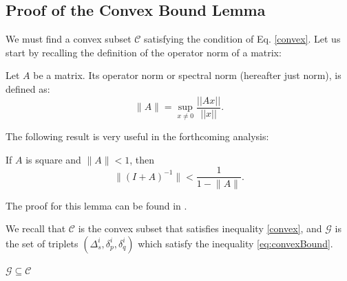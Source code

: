 \subsection{Proof of the Convex Bound Lemma}
\label{sec:appendix1}
We must find a convex subset $\mathcal{C}$ satisfying the condition of Eq. \ref{convex}. Let
us start by recalling the definition of the operator norm of a matrix:
\begin{definition}
Let $A$ be a matrix. Its operator norm or
spectral norm (hereafter just norm), is defined as:
\begin{equation}
\Big \| A \Big \| = \sup_{x \neq 0}\frac{||Ax||}{||x||}.
\end{equation}
\end{definition}
The following result is very useful in the forthcoming analysis:
\begin{lemma} \label{lemma:newman}
If $A$ is square and $\Big \| A \Big \| < 1$, then
\begin{equation*}
\Big \| (I+A)^{-1} \Big \| < \frac{1}{1- \Big \|A \Big \|}.
\end{equation*}
\end{lemma}
The proof for this lemma can be found in \cite{gabel2015monitoring}.

We recall that $\mathcal{C}$ is the convex subset that satisfies
inequality \ref{convex}, and $\mathcal{G}$ is the set of triplets
$(\Delta_s^i, \delta_p^i, \delta_q^i)$
which satisfy the inequality \ref{eq:convexBound}.

\begin{lemma} \label{eq:GinC}
$\mathcal{G} \subseteq \mathcal{C}$

\end{lemma}

